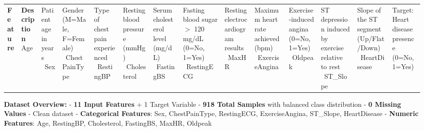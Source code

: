 \documentclass[11pt]{article}
\begin{document}
{\def\LTcaptype{none} %
\begin{longtable}[]{@{}p{2.5cm}p{9cm}@{}}
\toprule\noalign{}
\textbf{Feature} & \textbf{Description} \
\midrule\noalign{}
\endhead
\bottomrule\noalign{}
\endlastfoot
Age & Patient age in years \
Sex & Gender (M=Male, F=Female) \
ChestPainType & Type of chest pain experienced \
RestingBP & Resting blood pressure (mmHg) \
Cholesterol & Serum cholesterol level (mg/dL) \
FastingBS & Fasting blood sugar $>$ 120 mg/dL (0=No, 1=Yes) \
RestingECG & Resting electrocardiogram results \
MaxHR & Maximum heart rate achieved (bpm) \
ExerciseAngina & Exercise-induced angina (0=No, 1=Yes) \
Oldpeak & ST depression induced by exercise relative to rest \
ST\_Slope & Slope of the ST segment (Up/Flat/Down) \
HeartDisease & Target: Heart disease presence (0=No, 1=Yes) \
\end{longtable}
}

\textbf{Dataset Overview:} - \textbf{11 Input Features} + 1 Target
Variable - \textbf{918 Total Samples} with balanced class distribution -
\textbf{0 Missing Values} - Clean dataset - \textbf{Categorical
Features}: Sex, ChestPainType, RestingECG, ExerciseAngina, ST\_Slope,
HeartDisease - \textbf{Numeric Features}: Age, RestingBP, Cholesterol,
FastingBS, MaxHR, Oldpeak
\end{document}
